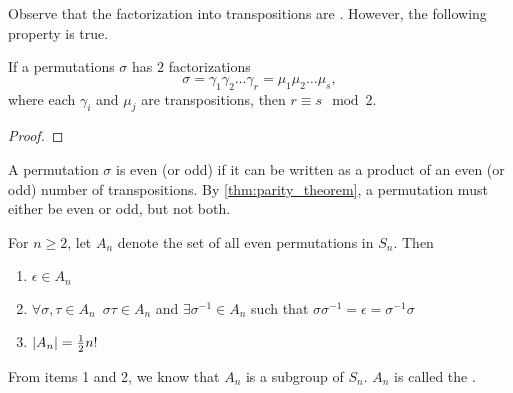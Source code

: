 Observe that the factorization into transpositions are . However, the following property is true.

\begin{thm}\label{thm:parity_theorem}
  If a permutations $\sigma$ has $2$ factorizations
  \begin{equation*}
    \sigma = \gamma_1 \gamma_2 \hdots \gamma_r = \mu_1 \mu_2 \hdots \mu_s,
  \end{equation*}
  where each $\gamma_i$ and $\mu_j$ are transpositions, then $r \equiv s \mod 2$.
\end{thm}

\begin{proof}
\end{proof}

\begin{defn}\label{defn:odd_and_even_permutations}
  A permutation $\sigma$ is even (or odd) if it can be written as a product of an even (or odd) number of transpositions. By \autoref{thm:parity_theorem}, a permutation must either be even or odd, but not both.
\end{defn}

\begin{thm}\label{thm:alternating_group}
  For $n \geq 2$, let $A_n$ denote the set of all even permutations in $S_n$. Then
  \begin{enumerate}
    \item $\epsilon \in A_n$
    \item $\forall \sigma, \tau \in A_n \enspace \sigma \tau \in A_n$ and $\exists \sigma^{-1} \in A_n$ such that $\sigma \sigma^{-1} = \epsilon = \sigma^{-1} \sigma$
    \item $\left|A_n\right| = \frac{1}{2} n!$
  \end{enumerate}
\end{thm}

\begin{note}
  From items 1 and 2, we know that $A_n$ is a subgroup of $S_n$. $A_n$ is called the .
\end{note}

